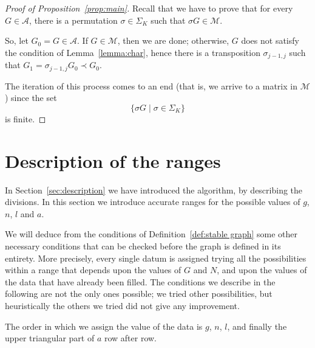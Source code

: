\documentclass{amsart}
\theoremstyle{plain}
\theoremstyle{definition}
\newtheorem{notation}[theorem]{Notation}
\DeclareMathOperator{\MAX}{max}
\begin{document}
\begin{proof}[Proof of Proposition~\ref{prop:main}]
  Recall that we have to prove that for every $G \in \mathcal{A}$,
  there is a permutation $\sigma \in \Sigma_K$ such that $\sigma G \in
  \mathcal{M}$.

  So, let $G_0 = G \in \mathcal{A}$. If $G \in \mathcal{M}$, then we
  are done; otherwise, $G$ does not satisfy the condition of
  Lemma~\ref{lemma:char}, hence there is a transposition $\sigma_{j-1,
    j}$ such that $G_1 = \sigma_{j-1,j} G_0 \prec G_0$.

  The iteration of this process comes to an end (that is, we arrive to
  a matrix in $\mathcal{M}$) since the set
  \[
  \bigl\{ \sigma G \mid \sigma \in \Sigma_K\bigr\}
  \]
  is finite.
\end{proof}



\section{Description of the ranges}\label{sec:ranges}

In Section~\ref{sec:description} we have introduced the algorithm, by
describing the divisions. In this section we introduce accurate ranges
for the possible values of $g$, $n$, $l$ and $a$.

We will deduce from the conditions of Definition~\ref{def:stable
  graph} some other necessary conditions that can be checked before
the graph is defined in its entirety. More precisely, every single
datum is assigned trying all the possibilities within a range that
depends upon the values of $G$ and $N$, and upon the values of the
data that have already been filled. The conditions we describe in the
following are not the only ones possible; we tried other possibilities, 
but heuristically the others we tried did not give any improvement.

The order in which we assign the value of the data is $g$, $n$, $l$, and
finally the upper triangular part of $a$ row after row.

\end{document}
